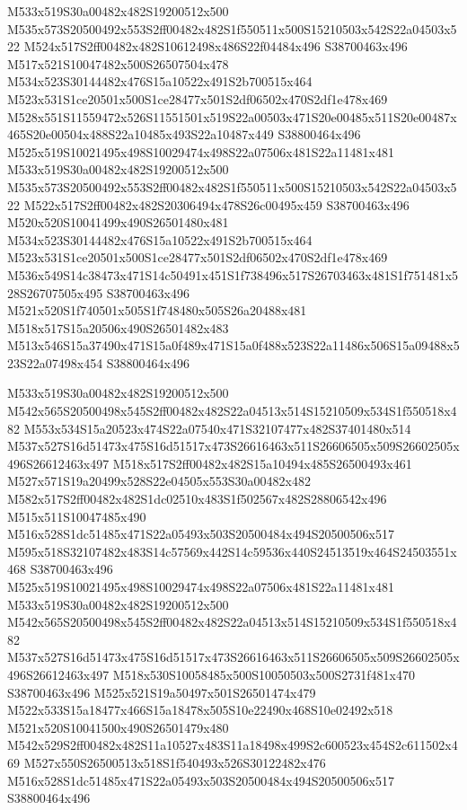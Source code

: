 \documentclass{article}
\begin{document}
\begin{multicols}{2}
M533x519S30a00482x482S19200512x500 M535x573S20500492x553S2ff00482x482S1f550511x500S15210503x542S22a04503x522 M524x517S2ff00482x482S10612498x486S22f04484x496 S38700463x496 M517x521S10047482x500S26507504x478 M534x523S30144482x476S15a10522x491S2b700515x464 M523x531S1ce20501x500S1ce28477x501S2df06502x470S2df1e478x469 M528x551S11559472x526S11551501x519S22a00503x471S20e00485x511S20e00487x465S20e00504x488S22a10485x493S22a10487x449 S38800464x496 M525x519S10021495x498S10029474x498S22a07506x481S22a11481x481 M533x519S30a00482x482S19200512x500 M535x573S20500492x553S2ff00482x482S1f550511x500S15210503x542S22a04503x522 M522x517S2ff00482x482S20306494x478S26c00495x459 S38700463x496 M520x520S10041499x490S26501480x481 M534x523S30144482x476S15a10522x491S2b700515x464 M523x531S1ce20501x500S1ce28477x501S2df06502x470S2df1e478x469 M536x549S14c38473x471S14c50491x451S1f738496x517S26703463x481S1f751481x528S26707505x495 S38700463x496 M521x520S1f740501x505S1f748480x505S26a20488x481 M518x517S15a20506x490S26501482x483 M513x546S15a37490x471S15a0f489x471S15a0f488x523S22a11486x506S15a09488x523S22a07498x454 S38800464x496

M533x519S30a00482x482S19200512x500 M542x565S20500498x545S2ff00482x482S22a04513x514S15210509x534S1f550518x482 M553x534S15a20523x474S22a07540x471S32107477x482S37401480x514 M537x527S16d51473x475S16d51517x473S26616463x511S26606505x509S26602505x496S26612463x497 M518x517S2ff00482x482S15a10494x485S26500493x461 M527x571S19a20499x528S22e04505x553S30a00482x482 M582x517S2ff00482x482S1dc02510x483S1f502567x482S28806542x496 M515x511S10047485x490 M516x528S1dc51485x471S22a05493x503S20500484x494S20500506x517 M595x518S32107482x483S14c57569x442S14c59536x440S24513519x464S24503551x468 S38700463x496 M525x519S10021495x498S10029474x498S22a07506x481S22a11481x481 M533x519S30a00482x482S19200512x500 M542x565S20500498x545S2ff00482x482S22a04513x514S15210509x534S1f550518x482 M537x527S16d51473x475S16d51517x473S26616463x511S26606505x509S26602505x496S26612463x497 M518x530S10058485x500S10050503x500S2731f481x470 S38700463x496 M525x521S19a50497x501S26501474x479 M522x533S15a18477x466S15a18478x505S10e22490x468S10e02492x518 M521x520S10041500x490S26501479x480 M542x529S2ff00482x482S11a10527x483S11a18498x499S2c600523x454S2c611502x469 M527x550S26500513x518S1f540493x526S30122482x476 M516x528S1dc51485x471S22a05493x503S20500484x494S20500506x517 S38800464x496


\end{multicols}
\end{document}
